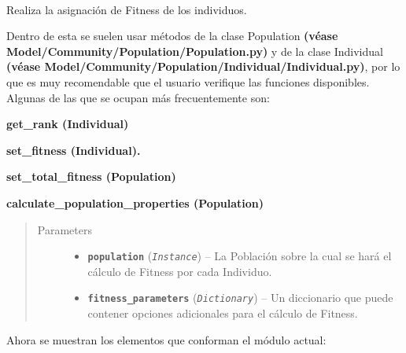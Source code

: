 \documentclass[letterpaper,10pt,english]{sphinxmanual}
\begin{document}
\begin{fulllineitems}
~
\begin{DUlineblock}{0em}
\item[] Realiza la asignación de Fitness de los individuos.
\item[] Dentro de esta se suelen usar métodos de la clase Population \textbf{(véase Model/Community/Population/Population.py)}
y de la clase Individual \textbf{(véase Model/Community/Population/Individual/Individual.py)}, por lo que es
muy recomendable que el usuario verifique las funciones disponibles. Algunas de las que se ocupan
más frecuentemente son:
\item[]
\begin{DUlineblock}{\DUlineblockindent}
\item[] \textbf{get\_rank (Individual)}
\item[] \textbf{set\_fitness (Individual).}
\item[] \textbf{set\_total\_fitness (Population)}
\item[] \textbf{calculate\_population\_properties (Population)}
\end{DUlineblock}
\end{DUlineblock}
\begin{quote}\begin{description}
\item[{Parameters}] \leavevmode\begin{itemize}
\item {} 
\textbf{\texttt{population}} (\emph{\texttt{Instance}}) -- La Población sobre la cual se hará el cálculo de Fitness por cada Individuo.

\item {} 
\textbf{\texttt{fitness\_parameters}} (\emph{\texttt{Dictionary}}) -- Un diccionario que puede contener opciones adicionales para el cálculo
de Fitness.

\end{itemize}

\end{description}\end{quote}

\end{fulllineitems}


Ahora se muestran los elementos que conforman el módulo actual:
\end{document}
